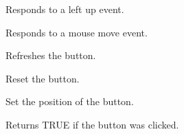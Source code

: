 
Responds to a left up event.


\label{cbminibuttononmotion}


Responds to a mouse move event.


\label{cbminibuttonrefresh}


Refreshes the button.


\label{cbminibuttonreset}


Reset the button.


\label{cbminibuttonsetpos}


Set the position of the button.


\label{cbminibuttonwasclicked}


Returns TRUE if the button was clicked.

